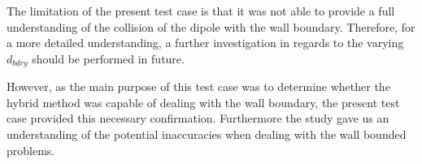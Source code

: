 
The limitation of the present test case is that it was not able to provide a full understanding of the collision of the dipole with the wall boundary. Therefore, for a more detailed understanding, a further investigation in regards to the varying $d_{bdry}$ should be performed in future. 

However, as the main purpose of this test case was to determine whether the hybrid method was capable of dealing with the wall boundary, the present test case provided this necessary confirmation. Furthermore the study gave us an understanding of the potential inaccuracies when dealing with the wall bounded problems. %








